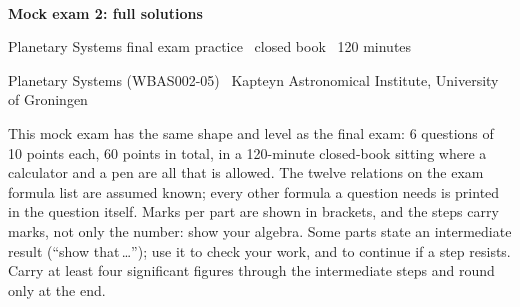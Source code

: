 
\newcommand{\pts}[1]{{\normalfont\small\bfseries\color{ipsAccent}[#1~pts]}\enspace}

\thispagestyle{fancy}

\begingroup
\noindent{\color{ipsAccent}\rule{\linewidth}{1.2pt}}\\[8pt]
{\LARGE\bfseries\color{ipsPrimary} Mock exam 2\ifipssolutions: full solutions\fi\par}
\vskip7pt
{\normalsize\color{ipsAccent} Planetary Systems final exam practice \textbullet\ closed book \textbullet\ 120 minutes\par}
\vskip3pt
{\footnotesize Planetary Systems (WBAS002-05) \textbullet\ Kapteyn Astronomical Institute, University of Groningen\par}
\vskip7pt
\noindent{\color{ipsAccent}\rule{\linewidth}{0.6pt}}
\vskip10pt
\endgroup

This mock exam has the same shape and level as the final exam: 6 questions of 10 points each, 60 points in total, in a 120-minute closed-book sitting where a calculator and a pen are all that is allowed.
The twelve relations on the exam formula list are assumed known; every other formula a question needs is printed in the question itself.
Marks per part are shown in brackets, and the steps carry marks, not only the number: show your algebra.
Some parts state an intermediate result (``show that\,\ldots''); use it to check your work, and to continue if a step resists.
Carry at least four significant figures through the intermediate steps and round only at the end.

